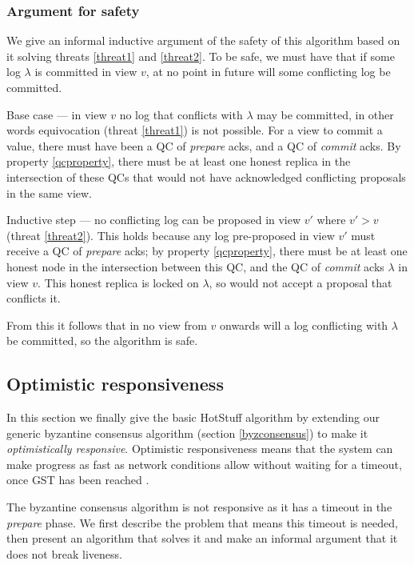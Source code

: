 \subsubsection{Argument for safety}
We give an informal inductive argument of the safety of this algorithm based on it solving threats \ref{threat1} and \ref{threat2}. To be safe, we must have that if some log $\lambda$ is committed in view $v$, at no point in future will some conflicting log be committed.

Base case --- in view $v$ no log that conflicts with $\lambda$ may be committed, in other words equivocation (threat \ref{threat1}) is not possible. For a view to commit a value, there must have been a QC of \textit{prepare} acks, and a QC of \textit{commit} acks. By property \ref{qcproperty}, there must be at least one honest replica in the intersection of these QCs that would not have acknowledged conflicting proposals in the same view.

Inductive step --- no conflicting log can be proposed in view $v'$ where $v' > v$ (threat \ref{threat2}). This holds because any log pre-proposed in view $v'$ must receive a QC of \textit{prepare} acks; by property \ref{qcproperty}, there must be at least one honest node in the intersection between this QC, and the QC of \textit{commit} acks $\lambda$ in view $v$. This honest replica is locked on $\lambda$, so would not accept a proposal that conflicts it.

From this it follows that in no view from $v$ onwards will a log conflicting with $\lambda$ be committed, so the algorithm is safe.

\subsection{Optimistic responsiveness} \label{optresponsive}
In this section we finally give the basic HotStuff algorithm by extending our generic byzantine consensus algorithm (section \ref{byzconsensus}) to make it \textit{optimistically responsive}. Optimistic responsiveness means that the system can make progress as fast as network conditions allow without waiting for a timeout, once GST has been reached \cite{passThunderellaBlockchainsOptimistic2018}.

The byzantine consensus algorithm is not responsive as it has a timeout in the \textit{prepare} phase. We first describe the problem that means this timeout is needed, then present an algorithm that solves it and make an informal argument that it does not break liveness.

